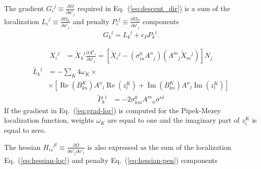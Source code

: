 \documentclass[aps,prl,reprint,amsmath,amssymb]{revtex4-1}
\begin{document}
The gradient ${G_i}^j \equiv \frac{\partial \Omega}{\partial {a^i}_j}$  required in Eq.~(\ref{eq:descent_dir}) is a sum of the localization ${L_i}^j \equiv \frac{\partial \Omega_L}{\partial {a^i}_j}$ and penalty ${P_i}^j \equiv \frac{\partial \Omega_P}{\partial {a^i}_j}$ components
%
\begin{equation} \label{eq:grad}
\begin{split}
G{_k}^{l} = L{_k}^{l} + c_P P{_k}^{l}.
\end{split}
\end{equation}
%

%
\begin{equation} \label{eq:grad-convert}
\begin{split}
{X_i}^j & = \tilde{X}{_k}^l \frac{\partial {A^k}_l}{\partial {a^i}_j} = \left[ \tilde{X}{_i}^j - ( \sigma_{in}^0 {A^n}_j ) ( {A^m}_j \tilde{X}{_m}^j ) \right] N_j 
\end{split}
\end{equation}
%
\begin{equation} \label{eq:grad-loc}
\begin{split}
\tilde{L}{_k}^l & = - \sum_K {4 \omega_K} \times \\ 
&\times \left[  \operatorname{Re}(B^{K}_{kn}) {A^{n}}_{l} \operatorname{Re}(z_{l}^{K}) + \operatorname{Im}(B^{K}_{kn}) {A^{n}}_{l} \operatorname{Im}(z_{l}^{K}) \right]
\end{split}
\end{equation}
%
\begin{equation} \label{eq:grad-pen}
\begin{split}
\tilde{P}{_k}^l & = -2 \sigma_{km}^0 {A^m}_n \sigma^{nl}
\end{split}
\end{equation}
%
If the gradient in Eq.~(\ref{eq:grad-loc}) is computed for the Pipek-Mezey localization function, weights $\omega_K$ are equal to one and the imaginary part of $z_{i}^{K}$ is equal to zero.



The hessian ${H_{is}}^{jt} \equiv \frac{\partial \Omega}{\partial {a^i}_j \partial{a^s}_t}$ is also expressed as the sum of the localization Eq.~(\ref{eq:hessian-loc}) and penalty Eq.~(\ref{eq:hessian-pen}) components
\end{document}
